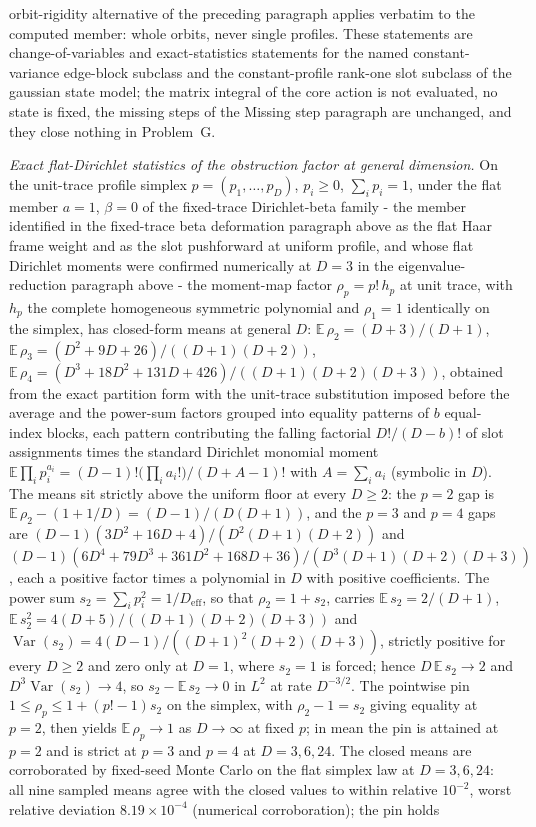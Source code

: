 orbit-rigidity alternative of the preceding paragraph applies verbatim to the computed member: whole orbits, never single profiles. These statements are change-of-variables and exact-statistics statements for the named constant-variance edge-block subclass and the constant-profile rank-one slot subclass of the gaussian state model; the matrix integral of the core action is not evaluated, no state is fixed, the missing steps of the Missing step paragraph are unchanged, and they close nothing in Problem~G.

\emph{Exact flat-Dirichlet statistics of the obstruction factor at general dimension.} On the unit-trace profile simplex \(p=(p_{1},\dots,p_{D})\), \(p_{i}\ge0\), \(\sum_{i}p_{i}=1\), under the flat member \(a=1\), \(\beta=0\) of the fixed-trace Dirichlet-beta family - the member identified in the fixed-trace beta deformation paragraph above as the flat Haar frame weight and as the slot pushforward at uniform profile, and whose flat Dirichlet moments were confirmed numerically at \(D=3\) in the eigenvalue-reduction paragraph above - the moment-map factor \(\rho_{p}=p!\,h_{p}\) at unit trace, with \(h_{p}\) the complete homogeneous symmetric polynomial and \(\rho_{1}=1\) identically on the simplex, has closed-form means at general \(D\): \(\mathbb{E}\,\rho_{2}=(D+3)/(D+1)\), \(\mathbb{E}\,\rho_{3}=(D^{2}+9D+26)/((D+1)(D+2))\), \(\mathbb{E}\,\rho_{4}=(D^{3}+18D^{2}+131D+426)/((D+1)(D+2)(D+3))\), obtained from the exact partition form with the unit-trace substitution imposed before the average and the power-sum factors grouped into equality patterns of \(b\) equal-index blocks, each pattern contributing the falling factorial \(D!/(D-b)!\) of slot assignments times the standard Dirichlet monomial moment \(\mathbb{E}\prod_{i}p_{i}^{a_{i}}=(D-1)!\bigl(\prod_{i}a_{i}!\bigr)/(D+A-1)!\) with \(A=\sum_{i}a_{i}\) (symbolic in \(D\)). The means sit strictly above the uniform floor at every \(D\ge2\): the \(p=2\) gap is \(\mathbb{E}\,\rho_{2}-(1+1/D)=(D-1)/(D(D+1))\), and the \(p=3\) and \(p=4\) gaps are \((D-1)(3D^{2}+16D+4)/(D^{2}(D+1)(D+2))\) and \((D-1)(6D^{4}+79D^{3}+361D^{2}+168D+36)/(D^{3}(D+1)(D+2)(D+3))\), each a positive factor times a polynomial in \(D\) with positive coefficients. The power sum \(s_{2}=\sum_{i}p_{i}^{2}=1/D_{\mathrm{eff}}\), so that \(\rho_{2}=1+s_{2}\), carries \(\mathbb{E}\,s_{2}=2/(D+1)\), \(\mathbb{E}\,s_{2}^{2}=4(D+5)/((D+1)(D+2)(D+3))\) and \(\operatorname{Var}(s_{2})=4(D-1)/((D+1)^{2}(D+2)(D+3))\), strictly positive for every \(D\ge2\) and zero only at \(D=1\), where \(s_{2}=1\) is forced; hence \(D\,\mathbb{E}\,s_{2}\to2\) and \(D^{3}\operatorname{Var}(s_{2})\to4\), so \(s_{2}-\mathbb{E}\,s_{2}\to0\) in \(L^{2}\) at rate \(D^{-3/2}\). The pointwise pin \(1\le\rho_{p}\le1+(p!-1)s_{2}\) on the simplex, with \(\rho_{2}-1=s_{2}\) giving equality at \(p=2\), then yields \(\mathbb{E}\,\rho_{p}\to1\) as \(D\to\infty\) at fixed \(p\); in mean the pin is attained at \(p=2\) and is strict at \(p=3\) and \(p=4\) at \(D=3,6,24\). The closed means are corroborated by fixed-seed Monte Carlo on the flat simplex law at \(D=3,6,24\): all nine sampled means agree with the closed values to within relative \(10^{-2}\), worst relative deviation \(8.19\times10^{-4}\) (numerical corroboration); the pin holds 